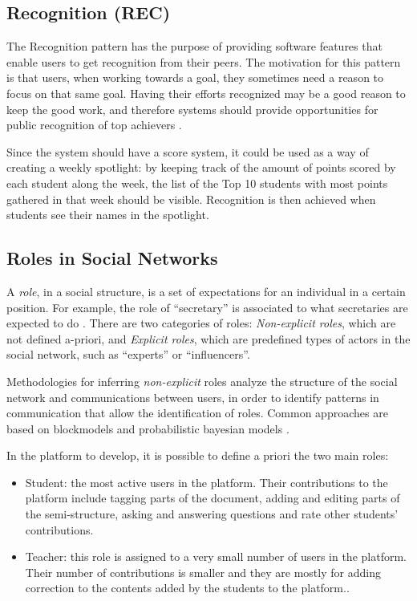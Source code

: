 \documentclass{llncs}
\begin{document}
\subsection{Recognition (REC)}

The Recognition pattern has the purpose of providing software features that enable users to get recognition from their peers. The motivation for this pattern is that users, when working towards a goal, they sometimes need a reason to focus on that same goal. Having their efforts recognized may be a good reason to keep the good work, and therefore systems should provide opportunities for public recognition of top achievers \cite{oduor2014persuasive}. 

Since the system should have a score system, it could be used as a way of creating a weekly spotlight: by keeping track of the amount of points scored by each student along the week, the list of the Top 10 students with most points gathered in that week should be visible. Recognition is then achieved when students see their names in the spotlight.

\subsection{Roles in Social Networks}
A \textit{role}, in a social structure, is a set of expectations for an individual in a certain position. For example, the role of ``secretary'' is associated to what secretaries are expected to do \cite{forestier2012roles,nadel1957theory}.
There are two categories of roles: \textit{Non-explicit roles}, which are not defined a-priori, and \textit{Explicit roles}, which are predefined types of actors in the social network, such as ``experts'' or ``influencers''.

Methodologies for inferring \textit{non-explicit} roles analyze the structure of the social network and communications between users, in order to identify patterns in communication that allow the identification of roles. Common approaches are based on blockmodels \cite{borgatti1993two,breiger1975algorithm} and probabilistic bayesian models \cite{steyvers2004probabilistic,mccallum2007topic,daud2009generalized}.

In the platform to develop, it is possible to define a priori the two main roles:
\begin{itemize}
\item Student: the most active users in the platform. Their contributions to the platform include tagging parts of the document, adding and editing parts of the semi-structure, asking and answering questions and rate other students' contributions.

\item Teacher: this role is assigned to a very small number of users in the platform. Their number of contributions is smaller and they are mostly for adding correction to the contents added by the students to the platform..
\end{itemize}
\end{document}
